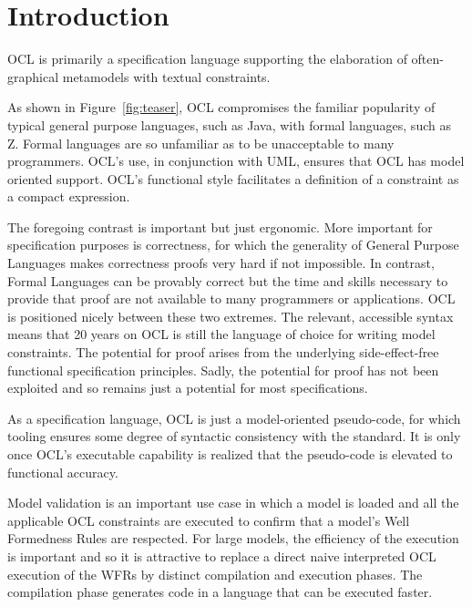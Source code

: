 \documentclass[sigconf]{acmart}
\begin{document}
\maketitle

\section{Introduction}
OCL is primarily a specification language supporting the elaboration
of often-graphical metamodels with textual constraints.

As shown in Figure~\ref{fig:teaser}, OCL\cite{OCL-2.4} compromises the familiar popularity of typical general purpose languages, such as Java, with formal languages, such as Z. Formal languages are so unfamiliar as to be unacceptable to many programmers. OCL's use, in conjunction with UML\cite{UML-2.5.1}, ensures that OCL has model oriented support. OCL's functional style facilitates a definition of a constraint as a compact expression.

The foregoing contrast is important but just ergonomic. More important for specification purposes is correctness, for which the generality of General Purpose Languages makes correctness proofs very hard if not impossible. In contrast, Formal Languages can be provably correct but the time and skills necessary to provide that proof are not available to many programmers or applications. OCL is positioned nicely between these two extremes. The relevant, accessible syntax means that 20 years on OCL is still the language of choice for writing model constraints. The potential for proof arises from the underlying side-effect-free functional specification principles. Sadly, the potential for proof has not been exploited and so remains just a potential for most specifications.

As a specification language, OCL is just a model-oriented pseudo-code, for which tooling ensures some degree of syntactic consistency with the standard. It is only once OCL's executable capability is realized that the pseudo-code is elevated to functional accuracy.

Model validation is an  important use case in which a model is loaded and all the applicable OCL constraints are executed to confirm that a model's Well Formedness Rules are respected. For large models, the efficiency of the execution is important and so it is attractive to replace a direct naive interpreted OCL execution of the WFRs by distinct compilation and execution phases. The compilation phase generates code in a language that can be executed faster.
\end{document}

